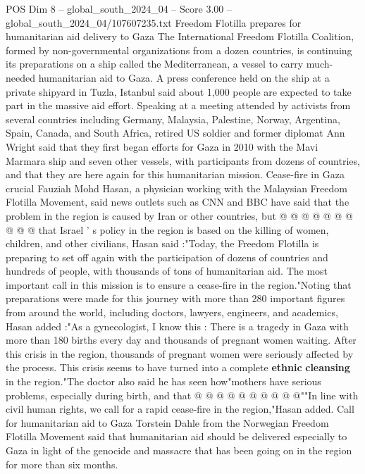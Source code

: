 \begin{textsample}{POS Dim 8 – global\_south\_2024\_04 – Score 3.00 – global\_south\_2024\_04/107607235.txt}  \label{ex:f8_pos_414}
Freedom Flotilla prepares for humanitarian aid delivery to Gaza The International Freedom Flotilla Coalition, formed by non-governmental organizations from a dozen countries, is continuing its preparations on a ship called the Mediterranean, a vessel to carry much-needed humanitarian aid to Gaza.
A press conference held on the ship at a private shipyard in Tuzla, Istanbul said about 1,000 people are expected to take part in the massive aid effort.
Speaking at a meeting attended by activists from several countries including Germany, Malaysia, Palestine, Norway, Argentina, Spain, Canada, and South Africa, retired US soldier and former diplomat Ann Wright said that they first began efforts for Gaza in 2010 with the Mavi Marmara ship and seven other vessels, with participants from dozens of countries, and that they are here again for this humanitarian mission.
Cease-fire in Gaza crucial Fauziah Mohd Hasan, a physician working with the Malaysian Freedom Flotilla Movement, said news outlets such as CNN and BBC have said that the problem in the region is caused by Iran or other countries, but @ @ @ @ @ @ @ @ @ @ that Israel ' s policy in the region is based on the killing of women, children, and other civilians, Hasan said :"Today, the Freedom Flotilla is preparing to set off again with the participation of dozens of countries and hundreds of people, with thousands of tons of humanitarian aid.
The most important call in this mission is to ensure a cease-fire in the region."Noting that preparations were made for this journey with more than 280 important figures from around the world, including doctors, lawyers, engineers, and academics, Hasan added :"As a gynecologist, I know this : There is a tragedy in Gaza with more than 180 births every day and thousands of pregnant women waiting.
After this crisis in the region, thousands of pregnant women were seriously affected by the process.
This crisis seems to have turned into a complete \textbf{ethnic} \textbf{cleansing} in the region."The doctor also said he has seen how"mothers have serious problems, especially during birth, and that @ @ @ @ @ @ @ @ @ @""In line with civil human rights, we call for a rapid cease-fire in the region,"Hasan added.
Call for humanitarian aid to Gaza Torstein Dahle from the Norwegian Freedom Flotilla Movement said that humanitarian aid should be delivered especially to Gaza in light of the genocide and massacre that has been going on in the region for more than six months.

\end{textsample}
